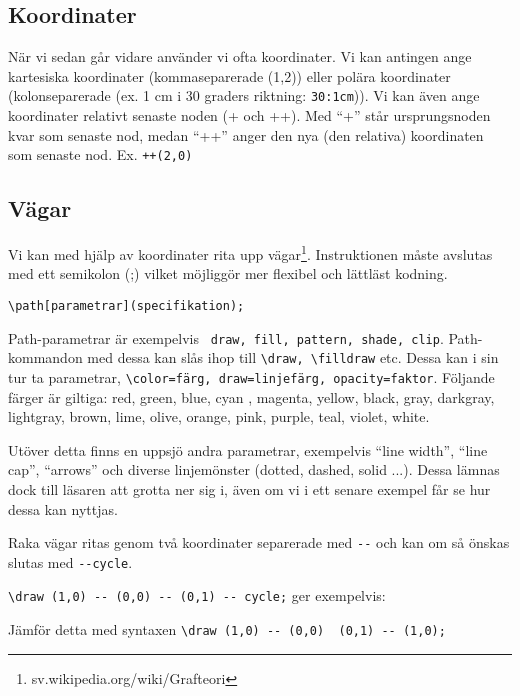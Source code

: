 \subsection{Koordinater}
När vi sedan går vidare använder vi ofta koordinater. Vi kan antingen ange kartesiska koordinater (kommaseparerade (1,2)) eller polära koordinater (kolonseparerade (ex. 1 cm i 30 graders riktning: \verb+30:1cm+)). Vi kan även ange koordinater relativt senaste noden (+ och ++). Med ``+'' står ursprungsnoden kvar som senaste nod, medan ``++'' anger den nya (den relativa) koordinaten som senaste nod. Ex. \verb?++(2,0)?

\subsection{Vägar}
Vi kan med hjälp av koordinater rita upp vägar\footnote{sv.wikipedia.org/wiki/Grafteori}. Instruktionen måste avslutas med ett semikolon (;) vilket möjliggör mer flexibel och lättläst kodning.

\verb+\path[parametrar](specifikation);+

Path-parametrar är exempelvis \verb+ draw, fill, pattern, shade, clip+. Path-kommandon med dessa kan slås ihop till \verb+\draw, \filldraw+ etc. Dessa kan i sin tur ta parametrar, \verb+\color=färg, draw=linjefärg, opacity=faktor+. Följande färger är giltiga: red, green, blue, cyan , magenta, yellow, black, gray, darkgray, lightgray, brown, lime, olive, orange, pink, purple, teal, violet, white.

Utöver detta finns en uppsjö andra parametrar, exempelvis ``line width'', ``line cap'', ``arrows'' och diverse linjemönster (dotted, dashed, solid ...). Dessa lämnas dock till läsaren att grotta ner sig i, även om vi i ett senare exempel får se hur dessa kan nyttjas.

Raka vägar ritas genom två koordinater separerade med \verb+--+ och kan om så önskas slutas med \verb+--cycle+.

\verb+\draw (1,0) -- (0,0) -- (0,1) -- cycle;+ ger exempelvis:


Jämför detta med syntaxen \verb+\draw (1,0) -- (0,0)  (0,1) -- (1,0);+


